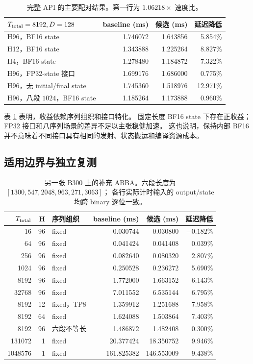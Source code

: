 \documentclass[11pt,a4paper,fontset=none]{ctexart}
\begin{document}
\begin{table}[htbp]\centering\small
\begin{tabular}{lrrr}\toprule
\(T_{\rm total}=8192,D=128\)&baseline (ms)&候选 (ms)&延迟降低\\\midrule
H96，BF16 state&1.746072&1.643856&5.854\%\\
H12，BF16 state&1.343888&1.225264&8.827\%\\
H4，BF16 state&1.278480&1.184872&7.322\%\\
H96，FP32-state 接口&1.699176&1.686000&0.775\%\\
H96，无 initial/final state&1.745360&1.518976&12.971\%\\
H96，八段 \(1024\)，BF16 state&1.185264&1.173888&0.960\%\\\bottomrule
\end{tabular}
\caption{完整 API 的主要配对结果。第一行为 \(1.06218\times\) 速度比。}
\label{tab:main}
\end{table}

表 \ref{tab:main} 表明，收益依赖序列组织和接口特化。
固定长度 BF16 state 下存在正收益；FP32 接口和八序列场景的差异不足以主张稳健加速。
这也说明，保持内部 BF16 并不意味着不同接口具有相同的发射、状态搬运和编译资源成本。

\subsection{适用边界与独立复测}
\begin{table}[htbp]\centering\small
\begin{tabular}{rrlrrr}\toprule
\(T_{\rm total}\)&H&序列组织&baseline (ms)&候选 (ms)&延迟降低\\\midrule
16&96&fixed&0.030744&0.030800&$-0.182\%$\\
64&96&fixed&0.041424&0.041408&0.039\%\\
256&96&fixed&0.082640&0.080320&2.807\%\\
1024&96&fixed&0.250528&0.236272&5.690\%\\
8192&96&fixed&1.772000&1.663152&6.143\%\\
32768&96&fixed&7.011552&6.535144&6.795\%\\
8192&12&fixed，TP8&1.359912&1.251688&7.958\%\\
8192&64&fixed&1.624088&1.503864&7.403\%\\
8192&96&六段不等长&1.486872&1.482408&0.300\%\\
131072&1&fixed&20.377424&18.350752&9.946\%\\
1048576&1&fixed&161.825382&146.553009&9.438\%\\\bottomrule
\end{tabular}
\caption{另一张 B300 上的补充 ABBA。六段长度为 \([1300,547,2048,963,271,3063]\)；
各行实际计时输入的 output/state 均跨 binary 逐位一致。}
\label{tab:boundary}
\end{table}
\end{document}
